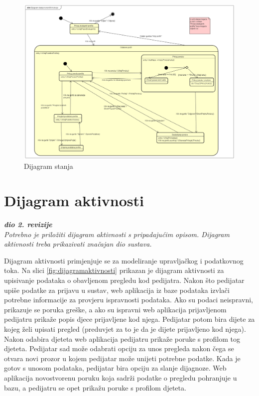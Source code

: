 			\begin{figure}[H]
				\includegraphics[width=\textwidth]{dijagrami/Dijagram stanja.PNG} %
				\caption{Dijagram stanja}
				\label{fig:dijagramstanja} %
			\end{figure}
			
			
			\eject 
		
		\section{Dijagram aktivnosti}
			
			\textbf{\textit{dio 2. revizije}}\\
			
			 \textit{Potrebno je priložiti dijagram aktivnosti s pripadajućim opisom. Dijagram aktivnosti treba prikazivati značajan dio sustava.}
			 
			 Dijagram aktivnosti primjenjuje se za modeliranje upravljačkog i podatkovnog toka. Na slici \ref{fig:dijagramaktivnosti} prikazan je dijagram aktivnosti za upisivanje podataka o obavljenom pregledu kod pedijatra. Nakon što pedijatar upiše podatke za prijavu u sustav, web aplikacija iz baze podataka izvlači potrebne informacije za provjeru ispravnosti podataka. Ako su podaci neispravni, prikazuje se poruka greške, a ako su ispravni web aplikacija prijavljenom pedijatru prikaže popis djece prijavljene kod njega. Pedijatar potom bira dijete za kojeg želi upisati pregled (preduvjet za to je da je dijete prijavljeno kod njega). Nakon odabira djeteta web aplikacija pedijatru prikaže poruke s profilom tog djeteta. Pedijatar sad može odabrati opciju za unos pregleda nakon čega se otvara novi prozor u kojem pedijatar može unijeti potrebne podatke. Kada je gotov s unosom podataka, pedijatar bira opciju za slanje dijagnoze. Web aplikacija novostvorenu poruku koja sadrži podatke o pregledu pohranjuje u bazu, a pedijatru se opet prikažu poruke s profilom djeteta.
			 
